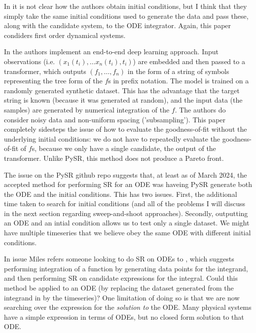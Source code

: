 \documentclass{article}
\begin{document}
In \cite{iba2008inference} it is not clear how the authors obtain initial conditions, but I think that they simply take the same initial conditions used to generate the data and pass these, along with the candidate system, to the ODE integrator. Again, this paper condiders first order dynamical systems.

In \cite{d2023odeformer} the authors implement an end-to-end deep learning approach.
Input observations (i.e. $(x_1(t_i), \dots x_n(t_i), t_i)$) are embedded and then passed to a transformer, which outputs $(f_1, \dots, f_n)$ in the form of a string of symbols representing the tree form of the $f$s in prefix notation.
The model is trained on a randomly generated synthetic dataset.
This has the advantage that the target string is known (because it was generated at random), and the input data (the samples) are generated by numerical integration of the $f$.
The authors do consider noisy data and non-uniform spacing ('subsampling').
This paper completely sidesteps the issue of how to evaluate the goodness-of-fit without the underlying initial conditions: we do not have to repeatedly evaluate the goodness-of-fit of $f$s, because we only have a single candidate, the output of the transformer.
Unlike PySR, this method does not produce a Pareto front.

The issue \cite{pysrissue568} on the PySR github repo suggests that, at least as of March 2024, the accepted method for performing SR for an ODE was haveing PySR generate both the ODE and the initial conditions.
This has two issues.
First, the additional time taken to search for initial conditions (and all of the problems I will discuss in the next section regarding sweep-and-shoot approaches).
Secondly, outputting an ODE and an intial condition allows us to test only a single dataset.
We might have multiple timeseries that we believe obey the same ODE with different initial conditions.

In issue \cite{pysrissue732} Miles refers someone looking to do SR on ODEs to \cite{pysrchangenotev1.3.0}, which suggests performing integration of a function by generating data points for the integrand, and then performing SR on candidate expressions for the integral.
Could this method be applied to an ODE (by replacing the dataset generated from the integrand in \cite{pysrchangenotev1.3.0} by the timeseries)?
One limitation of doing so is that we are now searching over the expression for the \emph{solution to} the ODE.
Many physical systems have a simple expression in terms of ODEs, but no closed form solution to that ODE.
\end{document}
